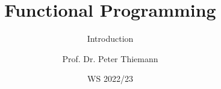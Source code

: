 
\title{Functional Programming}
\subtitle{Introduction}

\author[Peter Thiemann]{Prof. Dr. Peter Thiemann}
\date{WS 2022/23}

